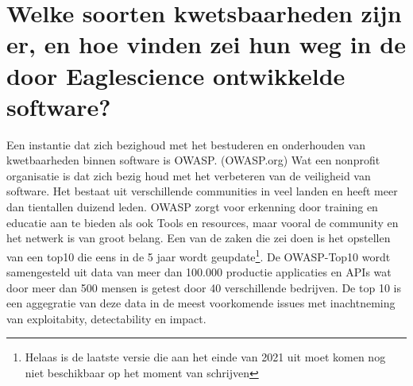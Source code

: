 \section{Welke soorten kwetsbaarheden zijn er, en hoe vinden zei hun weg in de door Eaglescience ontwikkelde software?}



Een instantie dat zich bezighoud met het bestuderen en onderhouden van kwetbaarheden binnen software is OWASP. (OWASP.org) Wat een nonprofit organisatie is dat zich bezig houd met het verbeteren van de veiligheid van software. Het bestaat uit verschillende communities in veel landen en heeft meer dan tientallen duizend leden. OWASP zorgt voor erkenning door training en educatie aan te bieden als ook Tools en resources, maar vooral de community en het netwerk is van groot belang. Een van de zaken die zei doen is het opstellen van een top10 die eens in de 5 jaar wordt geupdate\footnote{Helaas is de laatste versie die aan het einde van 2021 uit moet komen nog niet beschikbaar op het moment van schrijven}. De OWASP-Top10 wordt samengesteld uit data van meer dan 100.000 productie applicaties en APIs wat door meer dan 500 mensen is getest door 40 verschillende bedrijven. De top 10 is een aggegratie van deze data in de meest voorkomende issues met inachtneming van exploitabity, detectability en impact.
